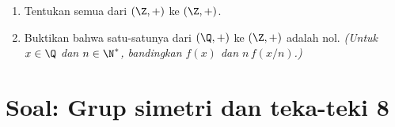 \begin{exercise}[$\star\star$]\label{exo:b1:structures:12}
\begin{enumerate}
  \item Tentukan semua   dari $(\Z, +)$ ke $(\Z, +)$.
  \item Buktikan bahwa satu-satunya   dari $(\Q, +)$ ke
        $(\Z, +)$ adalah  nol. \emph{(Untuk $x \in \Q$ dan
        $n \in \N^*$, bandingkan $f(x)$ dan $n\,f(x/n)$.)}
\end{enumerate}
\end{exercise}

\section{Soal: Grup simetri dan teka-teki 8}

